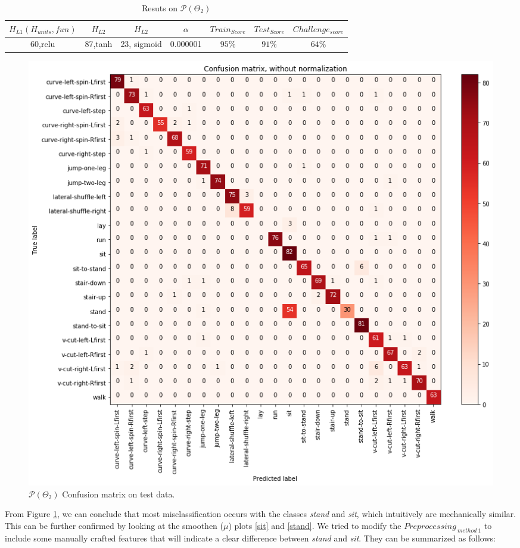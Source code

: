 \begin{table}[h!]
	\begin{center}
		\begin{tabular}{||c c c c c c c||}
			\hline
			$H_{L1}(H_{units},fun)$&$H_{L2}$&$H_{L2}$& $\alpha$ & $Train_{Score}$ & $Test_{Score}$  & $Challenge_{score}$  \\ [0.5ex]
			\hline
			60,relu
			&
			87,tanh
			&
			23, sigmoid
			&0.000001& $95\%$ & $91\%$ & $64\%$  \\
			\hline
		\end{tabular}
		\caption{Resuts on $\mathcal{P}(\Theta_{2})$}
		\label{table:p2_result}
	\end{center}
\end{table}

\begin{figure}[htpb!]
	\centering
	\includegraphics[width=\textwidth]{images/conf_ma.png}
	\caption{$\mathcal{P}(\Theta_{2})$  Confusion matrix on test data.}
	\label{fig:confusion}
\end{figure}


From Figure \ref{fig:confusion}, we can conclude that most misclassification occurs with the classes \emph{stand} and \emph{sit}, which intuitively are mechanically similar. This can be further confirmed by looking at the smoothen ($\mu$) plots \ref{sit} and \ref{stand}. We tried to modify the $Preprocessing_{ \ method \ 1}$ to include some manually crafted features that will indicate a clear difference between \emph{stand} and \emph{sit}. They can be summarized as follows:


